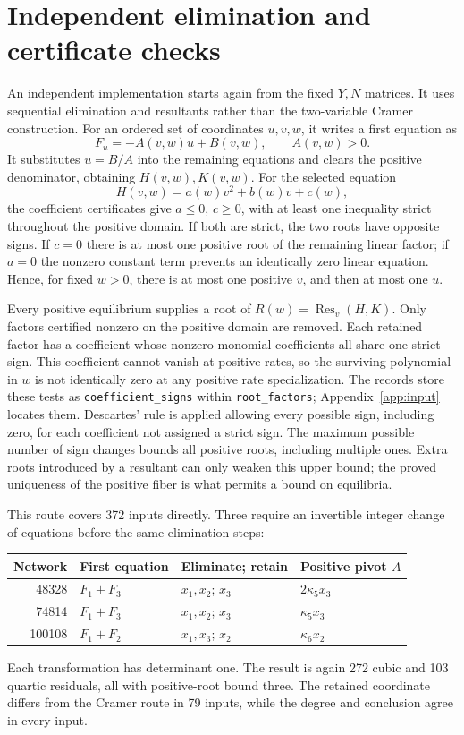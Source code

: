 \documentclass[11pt,a4paper]{article}
\begin{document}
\section{Independent elimination and certificate checks}\label{sec:independent}
An independent implementation starts again from the fixed $Y,N$
matrices. It uses sequential elimination and resultants rather
than the two-variable Cramer construction. For an ordered set of
coordinates $u,v,w$, it writes a first equation as
\[
 F_u=-A(v,w)u+B(v,w),\qquad A(v,w)>0.
\]
It substitutes $u=B/A$ into the remaining equations and clears
the positive denominator, obtaining $H(v,w),K(v,w)$.
For the selected equation
\[
 H(v,w)=a(w)v^2+b(w)v+c(w),
\]
the coefficient certificates give $a\leq0$, $c\geq0$, with at
least one inequality strict throughout the positive domain.
If both are strict, the two roots have opposite signs. If $c=0$
there is at most one positive root of the remaining linear factor;
if $a=0$ the nonzero constant term prevents an identically zero
linear equation. Hence, for fixed $w>0$, there is at most one
positive $v$, and then at most one $u$.

Every positive equilibrium supplies a root of
$R(w)=\operatorname{Res}_v(H,K)$. Only factors certified nonzero
on the positive domain are removed. Each retained factor has a coefficient whose nonzero monomial
coefficients all share one strict sign. This coefficient cannot
vanish at positive rates, so the surviving polynomial in $w$ is
not identically zero at any positive rate specialization. The
records store these tests as \texttt{coefficient\_signs} within
\texttt{root\_factors}; Appendix~\ref{app:input} locates them. Descartes' rule is
applied allowing every possible sign, including zero, for each
coefficient not assigned a strict sign. The maximum possible
number of sign changes bounds all positive roots, including
multiple ones. Extra roots introduced by a resultant can only
weaken this upper bound; the proved uniqueness of the positive
fiber is what permits a bound on equilibria.

This route covers 372 inputs directly. Three require an invertible
integer change of equations before the same elimination steps:
\begin{center}\small
\begin{tabular}{@{}rlll@{}}
\toprule
Network & First equation & Eliminate; retain & Positive pivot $A$\\
\midrule
48328 & $F_1+F_3$ & $x_1,x_2$; $x_3$ & $2\kappa_5x_3$\\
74814 & $F_1+F_3$ & $x_1,x_2$; $x_3$ & $\kappa_5x_3$\\
100108 & $F_1+F_2$ & $x_1,x_3$; $x_2$ & $\kappa_6x_2$\\
\bottomrule
\end{tabular}
\end{center}
Each transformation has determinant one. The result is again
272 cubic and 103 quartic residuals, all with positive-root bound
three. The retained coordinate differs from the Cramer route in
79 inputs, while the degree and conclusion agree in every input.
\end{document}
